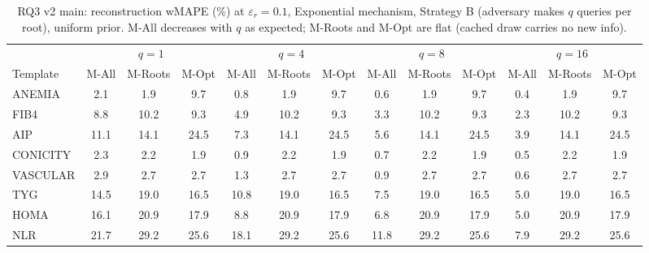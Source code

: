 \begin{table}[t]
\centering
\setlength{\tabcolsep}{3pt}
\footnotesize
\caption{RQ3 v2 main: reconstruction wMAPE (\%) at $\varepsilon_r=0.1$, Exponential mechanism, Strategy B (adversary makes $q$ queries per root), uniform prior. M-All decreases with $q$ as expected; M-Roots and M-Opt are flat (cached draw carries no new info).}
\label{tab:rq3_v2_main_uniform}
\begin{tabular}{lcccccccccccc}
\toprule
 & \multicolumn{3}{c}{$q=1$} & \multicolumn{3}{c}{$q=4$} & \multicolumn{3}{c}{$q=8$} & \multicolumn{3}{c}{$q=16$} \\
\cmidrule(lr){2-4} \cmidrule(lr){5-7} \cmidrule(lr){8-10} \cmidrule(lr){11-13}
Template & M-All & M-Roots & M-Opt & M-All & M-Roots & M-Opt & M-All & M-Roots & M-Opt & M-All & M-Roots & M-Opt \\
\midrule
ANEMIA & 2.1 & 1.9 & 9.7 & 0.8 & 1.9 & 9.7 & 0.6 & 1.9 & 9.7 & 0.4 & 1.9 & 9.7 \\
FIB4 & 8.8 & 10.2 & 9.3 & 4.9 & 10.2 & 9.3 & 3.3 & 10.2 & 9.3 & 2.3 & 10.2 & 9.3 \\
AIP & 11.1 & 14.1 & 24.5 & 7.3 & 14.1 & 24.5 & 5.6 & 14.1 & 24.5 & 3.9 & 14.1 & 24.5 \\
CONICITY & 2.3 & 2.2 & 1.9 & 0.9 & 2.2 & 1.9 & 0.7 & 2.2 & 1.9 & 0.5 & 2.2 & 1.9 \\
VASCULAR & 2.9 & 2.7 & 2.7 & 1.3 & 2.7 & 2.7 & 0.9 & 2.7 & 2.7 & 0.6 & 2.7 & 2.7 \\
TYG & 14.5 & 19.0 & 16.5 & 10.8 & 19.0 & 16.5 & 7.5 & 19.0 & 16.5 & 5.0 & 19.0 & 16.5 \\
HOMA & 16.1 & 20.9 & 17.9 & 8.8 & 20.9 & 17.9 & 6.8 & 20.9 & 17.9 & 5.0 & 20.9 & 17.9 \\
NLR & 21.7 & 29.2 & 25.6 & 18.1 & 29.2 & 25.6 & 11.8 & 29.2 & 25.6 & 7.9 & 29.2 & 25.6 \\
\bottomrule
\end{tabular}
\end{table}
